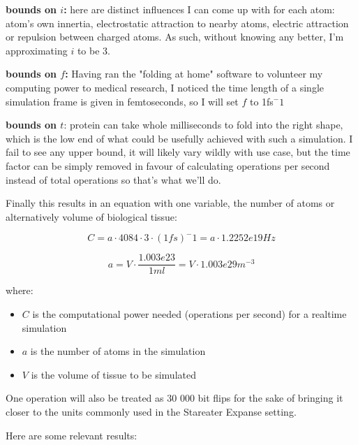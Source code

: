 \documentclass[a4paper]{article}
\begin{document}
	\medskip
	
	\textbf{bounds on $i$:} here are distinct influences I can come up with for each atom: atom's own innertia, electrostatic attraction to nearby atoms, electric attraction or repulsion between charged atoms. As such, without knowing any better, I'm approximating $i$ to be 3.
	
	\medskip
	
	\textbf{bounds on $f$:} Having ran the "folding at home" software to volunteer my computing power to medical research, I noticed the time length of a single simulation frame is given in femtoseconds, so I will set $f$ to 1fs$^-1$
	
	\medskip
	
	\textbf{bounds on $t$}: protein can take whole milliseconds to fold into the right shape, which is the low end of what could be usefully achieved with such a simulation. I fail to see any upper bound, it will likely vary wildly with use case, but the time factor can be simply removed in favour of calculating operations per second instead of total operations so that's what we'll do.
	
	\medskip
	
	Finally this results in an equation with one variable, the number of atoms or alternatively volume of biological tissue:
	
	$$ C = a \cdot 4084 \cdot 3 \cdot (1fs)^-1 = a \cdot 1.2252e19 Hz $$
	
	$$ a = V \cdot \frac{1.003e23}{1ml} = V \cdot 1.003e29m^{-3} $$
	
	where:
	
	\begin{itemize}
		\item $C$ is the computational power needed (operations per second) for a realtime simulation
		
		\item $a$ is the number of atoms in the simulation
		
		\item $V$ is the volume of tissue to be simulated
	\end{itemize}
	
	\medskip
	
	One operation will also be treated as 30 000 bit flips for the sake of bringing it closer to the units commonly used in the Stareater Expanse setting.
	
	\medskip
	
	Here are some relevant results:
	
\end{document}
